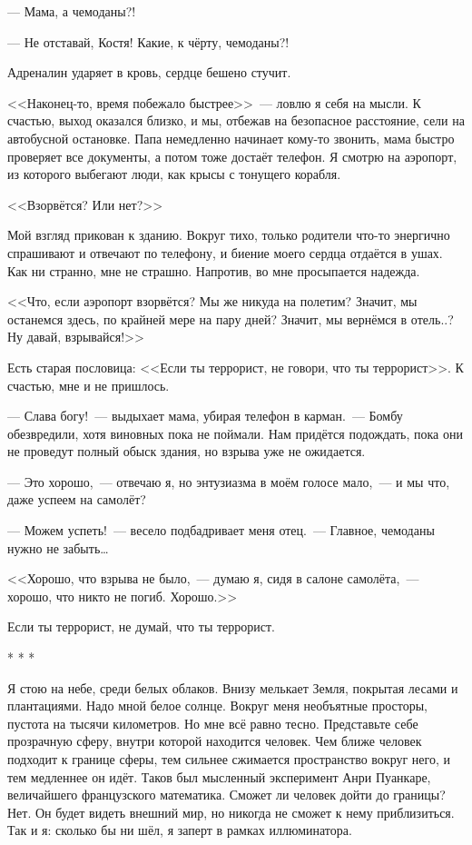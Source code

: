 \documentclass[openany, oneside]{book}
\begin{document}
--- Мама, а чемоданы?!

--- Не отставай, Костя! Какие, к чёрту, чемоданы?!

Адреналин ударяет в кровь, сердце бешено стучит.

<<Наконец-то, время побежало быстрее>>~--- ловлю я себя на мысли. К счастью, выход оказался близко, и мы, отбежав на безопасное расстояние, сели на автобусной остановке. Папа немедленно начинает кому-то звонить, мама быстро проверяет все документы, а потом тоже достаёт телефон. Я смотрю на аэропорт, из которого выбегают люди, как крысы с тонущего корабля.

<<Взорвётся? Или нет?>>

Мой взгляд прикован к зданию. Вокруг тихо, только родители что-то энергично спрашивают и отвечают по телефону, и биение моего сердца отдаётся в ушах. Как ни странно, мне не страшно. Напротив, во мне просыпается надежда.

<<Что, если аэропорт взорвётся? Мы же никуда на полетим? Значит, мы останемся здесь, по крайней мере на пару дней? Значит, мы вернёмся в отель..? Ну давай, взрывайся!>>

Есть старая пословица: <<Если ты террорист, не говори, что ты террорист>>. К счастью, мне и не пришлось.

--- Слава богу!~--- выдыхает мама, убирая телефон в карман.~--- Бомбу обезвредили, хотя виновных пока не поймали. Нам придётся подождать, пока они не проведут полный обыск здания, но взрыва уже не ожидается.

--- Это хорошо,~--- отвечаю я, но энтузиазма в моём голосе мало,~--- и мы что, даже успеем на самолёт?

--- Можем успеть!~--- весело подбадривает меня отец.~--- Главное, чемоданы нужно не забыть\dots

<<Хорошо, что взрыва не было,~--- думаю я, сидя в салоне самолёта,~--- хорошо, что никто не погиб. Хорошо.>>

Если ты террорист, не думай, что ты террорист.

\begin{center}
    * * *
\end{center}

Я стою на небе, среди белых облаков. Внизу мелькает Земля, покрытая лесами и плантациями. Надо мной белое солнце. Вокруг меня необъятные просторы, пустота на тысячи километров. Но мне всё равно тесно. Представьте себе прозрачную сферу, внутри которой находится человек. Чем ближе человек подходит к границе сферы, тем сильнее сжимается пространство вокруг него, и тем медленнее он идёт. Таков был мысленный эксперимент Анри Пуанкаре, величайшего французского математика. Сможет ли человек дойти до границы? Нет. Он будет видеть внешний мир, но никогда не сможет к нему приблизиться. Так и я: сколько бы ни шёл, я заперт в рамках иллюминатора.
\end{document}
